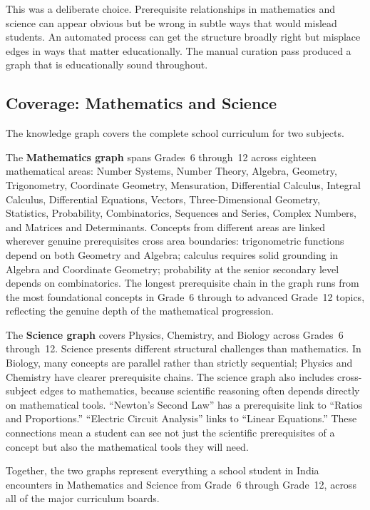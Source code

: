 \documentclass[12pt,a4paper]{article}
\begin{document}
This was a deliberate choice.
Prerequisite relationships in mathematics and science can appear obvious but be wrong in
subtle ways that would mislead students.
An automated process can get the structure broadly right but misplace edges in ways that
matter educationally.
The manual curation pass produced a graph that is educationally sound throughout.

\subsection{Coverage: Mathematics and Science}

The knowledge graph covers the complete school curriculum for two subjects.

The \textbf{Mathematics graph} spans Grades~6 through~12 across eighteen mathematical areas:
Number Systems, Number Theory, Algebra, Geometry, Trigonometry, Coordinate Geometry,
Mensuration, Differential Calculus, Integral Calculus, Differential Equations, Vectors,
Three-Dimensional Geometry, Statistics, Probability, Combinatorics, Sequences and Series,
Complex Numbers, and Matrices and Determinants.
Concepts from different areas are linked wherever genuine prerequisites cross area boundaries:
trigonometric functions depend on both Geometry and Algebra;
calculus requires solid grounding in Algebra and Coordinate Geometry;
probability at the senior secondary level depends on combinatorics.
The longest prerequisite chain in the graph runs from the most foundational concepts
in Grade~6 through to advanced Grade~12 topics,
reflecting the genuine depth of the mathematical progression.

The \textbf{Science graph} covers Physics, Chemistry, and Biology across Grades~6 through~12.
Science presents different structural challenges than mathematics.
In Biology, many concepts are parallel rather than strictly sequential;
Physics and Chemistry have clearer prerequisite chains.
The science graph also includes cross-subject edges to mathematics,
because scientific reasoning often depends directly on mathematical tools.
``Newton's Second Law'' has a prerequisite link to ``Ratios and Proportions.''
``Electric Circuit Analysis'' links to ``Linear Equations.''
These connections mean a student can see not just the scientific prerequisites of a concept
but also the mathematical tools they will need.

Together, the two graphs represent everything a school student in India encounters
in Mathematics and Science from Grade~6 through Grade~12,
across all of the major curriculum boards.
\end{document}
